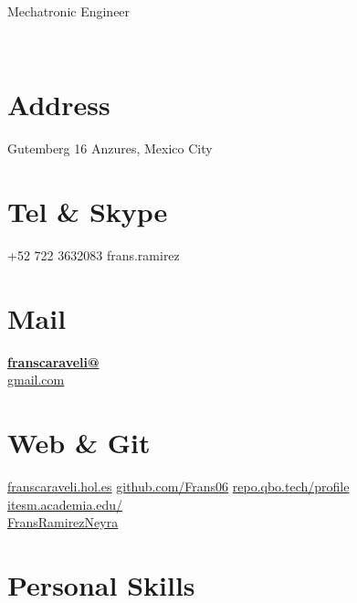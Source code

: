 \documentclass[]{friggeri-cv}
\begin{document}
      {Mechatronic Engineer}
      

\begin{aside}
	~
	~
	~
	~
	~
	~
	~
	~
	~	
  \section{Address}
    Gutemberg 16
    Anzures, Mexico City
    ~
  \section{Tel \& Skype}
    +52 722 3632083
    frans.ramirez
    ~
  \section{Mail}
    \href{mailto:franscaraveli@gmail.com}{\textbf{franscaraveli@}\\gmail.com}
    ~
  \section{Web \& Git}
    \href{http://fransramirez.hol.es}{franscaraveli.hol.es}
    \href{https://github.com/Frans06}{github.com/Frans06}
    \href{https://repo.qbo.tech:5443/profile}{repo.qbo.tech/profile}
    \href{https://itesm.academia.edu/FransRamirezNeyra}{itesm.academia.edu/\\FransRamirezNeyra}
    ~
  \section{Personal Skills}
	~
	~
    ~
\end{aside}
~
\end{document}
